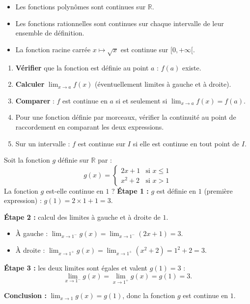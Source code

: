 \documentclass[11pt]{article}
\newcommand{\cle}[1]{{\popxbold\color{popdark}#1}}
\begin{document}
\begin{propriete}
\begin{itemize}
\item Les fonctions \cle{polynômes} sont continues sur $\mathbb{R}$.
\item Les fonctions \cle{rationnelles} sont continues sur chaque intervalle de leur ensemble de définition.
\item La fonction racine carrée $x\mapsto\sqrt{x}$ est continue sur $[0,+\infty[$.
\end{itemize}
\end{propriete}

\begin{methode}
\begin{enumerate}
\item \textbf{Vérifier} que la fonction est définie au point $a$ : $f(a)$ existe.
\item \textbf{Calculer} $\displaystyle\lim_{x\to a}f(x)$ (éventuellement limites à gauche et à droite).
\item \textbf{Comparer} : $f$ est continue en $a$ si et seulement si $\displaystyle\lim_{x\to a}f(x)=f(a)$.
\item Pour une fonction définie par morceaux, vérifier la continuité au point de raccordement en comparant les deux expressions.
\item Sur un intervalle : $f$ est continue sur $I$ si elle est continue en tout point de $I$.
\end{enumerate}
\end{methode}

\begin{exoresolu}
Soit la fonction $g$ définie sur $\mathbb{R}$ par :
\[g(x)=\begin{cases} 2x+1 & \text{si } x\leq 1 \\ x^2+2 & \text{si } x>1 \end{cases}\]
La fonction $g$ est-elle continue en $1$ ?
\tcblower
\textbf{Étape 1 :} $g$ est définie en $1$ (première expression) : $g(1)=2\times1+1=3$.

\textbf{Étape 2 :} calcul des limites à gauche et à droite de $1$.
\begin{itemize}
\item À gauche : $\displaystyle\lim_{x\to1^-}g(x)=\lim_{x\to1^-}(2x+1)=3$.
\item À droite : $\displaystyle\lim_{x\to1^+}g(x)=\lim_{x\to1^+}(x^2+2)=1^2+2=3$.
\end{itemize}

\textbf{Étape 3 :} les deux limites sont égales et valent $g(1)=3$ :
\[\lim_{x\to1^-}g(x)=\lim_{x\to1^+}g(x)=g(1)=3.\]

\textbf{Conclusion :} $\displaystyle\lim_{x\to1}g(x)=g(1)$, donc la fonction $g$ est \cle{continue} en $1$.
\end{exoresolu}
\end{document}
